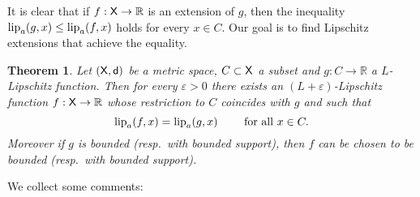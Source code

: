 \documentclass[9pt,reqno]{amsart}
\newtheorem{thm}{Theorem}[section]
\newcommand{\R}{\mathbb{R}}
\newcommand{\sfd}{{\sf d}}
\newcommand{\X}{{\sf X}}
\def\lipa#1#2{{\rm lip}_a (#1,#2)}
\def\ep{\varepsilon}
\begin{document}
It is clear that if $f:\X\to\R$ is an extension of $g$, then the inequality $\lipa{g}{x}\leq \lipa{f}{x}$ holds for every $x\in C$.  Our goal is to find Lipschitz extensions that achieve the equality.

\begin{thm}\label{thm:main} Let $(\X,\sfd)$  be a metric space, $C\subset \X$ a subset and  $g: C \to \mathbb{R}$ a $L$-Lipschitz function. Then for every $\ep>0$ there exists an $(L+\ep)$-Lipschitz function $f: \X \to \mathbb{R}$ whose restriction to $C$ coincides with $g$ and such that
\begin{equation}
\label{eq:lipaug}
\lipa{f}{x}=\lipa{g}{x} \qquad \text{ for all  } x \in C.
\end{equation}
Moreover if $g$ is bounded (resp.\ with bounded support), then $f$ can be chosen to be bounded (resp.\ with bounded support).
\end{thm}
We collect some comments:
\end{document}
